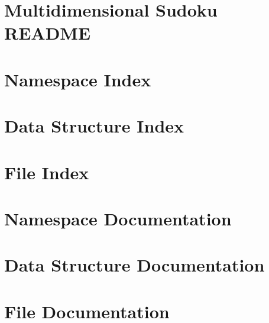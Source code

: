 \documentclass[twoside]{book}
\newcommand{\+}{\discretionary{\mbox{\scriptsize$\hookleftarrow$}}{}{}}
\newcommand{\clearemptydoublepage}{%
    \newpage{\pagestyle{empty}\cleardoublepage}%
  }
\begin{document}
\chapter{Multidimensional Sudoku README}
\label{md__c___users_tr_user__v_s__code_multidimensional_sudoku__r_e_a_d_m_e}

\chapter{Namespace Index}

\chapter{Data Structure Index}

\chapter{File Index}

\chapter{Namespace Documentation}

\chapter{Data Structure Documentation}









\chapter{File Documentation}


























































  \backmatter
  \newpage
  \clearemptydoublepage
  \printindex
\end{document}
